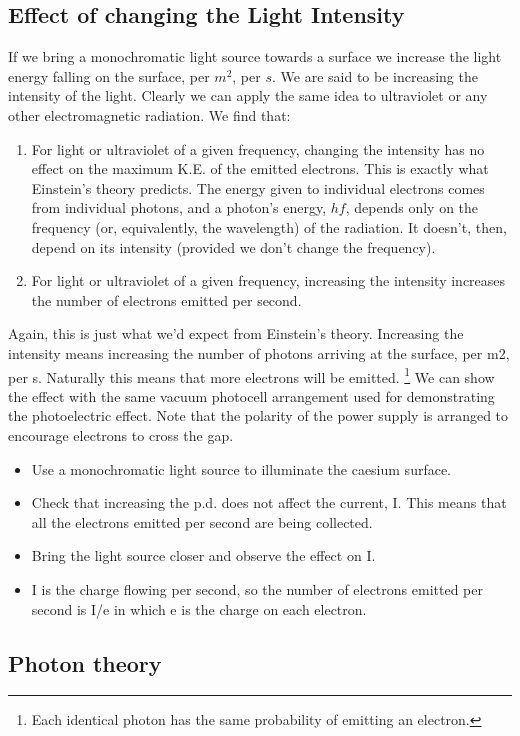 \documentclass[a4paper,12pt]{book}
\newcommand{\sidenote}[1]{\footnote{#1}}
\begin{document}
\subsection{Effect of changing the Light Intensity}
If we bring a monochromatic light source towards a surface we increase the light energy falling on the surface, per $m^2$, per $s$. We are said to be increasing the intensity of the light. Clearly we can apply the same idea to ultraviolet or any other electromagnetic radiation. We find that:
\begin{enumerate}
\item For light or ultraviolet of a given frequency, changing the intensity has no effect on the maximum K.E. of the emitted electrons. This is exactly what Einstein's theory predicts. The energy given to individual electrons comes from individual photons, and a photon's energy, $hf$, depends only on the frequency (or, equivalently, the wavelength) of the radiation. It doesn't, then, depend on its intensity (provided we don't change the frequency).

\item For light or ultraviolet of a given frequency, increasing the intensity increases the number of electrons emitted per second.
\end{enumerate}
Again, this is just what we'd expect from Einstein's theory. Increasing the intensity means increasing the number of photons arriving at the surface, per m2, per s.  Naturally this means that more electrons will be emitted. \sidenote{Each identical photon has the same probability of emitting an electron.} 
	We can show the effect with the same vacuum photocell arrangement used for demonstrating the photoelectric effect. Note that the polarity of the power supply is arranged to encourage electrons to cross the gap.
    \begin{itemize}
    \item Use a monochromatic light source to illuminate the caesium surface.
\item Check that increasing the p.d. does not affect the current, I. This means that all the electrons emitted per second are being collected.
\item Bring the light source closer and observe the effect on I.
\item I is the charge flowing per second, so the number of electrons emitted per second is I/e in which e is the charge on each electron.
 \end{itemize}

\subsection{Photon theory}
\end{document}
